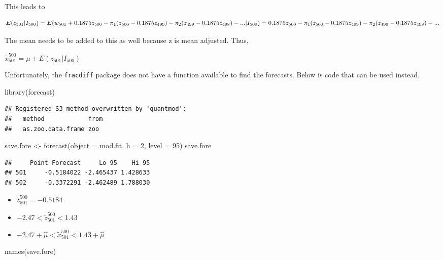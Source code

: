 \documentclass[
]{book}
\newenvironment{Shaded}{\begin{snugshade}}{\end{snugshade}}
\newcommand{\AttributeTok}[1]{\textcolor[rgb]{0.77,0.63,0.00}{#1}}
\newcommand{\DecValTok}[1]{\textcolor[rgb]{0.00,0.00,0.81}{#1}}
\newcommand{\FunctionTok}[1]{\textcolor[rgb]{0.00,0.00,0.00}{#1}}
\newcommand{\NormalTok}[1]{#1}
\newcommand{\OtherTok}[1]{\textcolor[rgb]{0.56,0.35,0.01}{#1}}
\theoremstyle{definition}
\theoremstyle{definition}
\theoremstyle{definition}
\theoremstyle{definition}
\theoremstyle{remark}
\begin{document}
This leads to

\[E(z_{501} | I_{500})=E(w_{501}+0.1875z_{500}-\pi_1(z_{500}-0.1875z_{499})\\-\pi_2(z_{499}-0.1875z_{498})-...| I_{500})=
\\0.1875z_{500}-\pi_1(z_{500}-0.1875z_{499})-\pi_2(z_{499}-0.1875z_{498})-...\]

The mean needs to be added to this as well because z is mean adjusted. Thus,

\(\tilde x^{500}_{501}=\mu+E(z_{501}| I_{500})\)

Unfortunately, the \texttt{fracdiff} package does not have a function available to find the forecasts. Below is code that can be used instead.

\begin{Shaded}
\begin{Highlighting}[]
\FunctionTok{library}\NormalTok{(forecast)}
\end{Highlighting}
\end{Shaded}

\begin{verbatim}
## Registered S3 method overwritten by 'quantmod':
##   method            from
##   as.zoo.data.frame zoo
\end{verbatim}

\begin{Shaded}
\begin{Highlighting}[]
\NormalTok{save.fore }\OtherTok{\textless{}{-}} \FunctionTok{forecast}\NormalTok{(}\AttributeTok{object =}\NormalTok{ mod.fit, }\AttributeTok{h =} \DecValTok{2}\NormalTok{, }\AttributeTok{level =} \DecValTok{95}\NormalTok{)}
\NormalTok{save.fore}
\end{Highlighting}
\end{Shaded}

\begin{verbatim}
##     Point Forecast     Lo 95    Hi 95
## 501     -0.5184022 -2.465437 1.428633
## 502     -0.3372291 -2.462489 1.788030
\end{verbatim}

\begin{itemize}
\item
  \(\tilde z^{500}_{501}=-0.5184\)
\item
  \(-2.47< \tilde z^{500}_{501}<1.43\)
\item
  \(-2.47+\hat \mu <\tilde x^{500}_{501} <1.43+\hat \mu\)
\end{itemize}

\begin{Shaded}
\begin{Highlighting}[]
\FunctionTok{names}\NormalTok{(save.fore)}
\end{Highlighting}
\end{Shaded}
\end{document}

